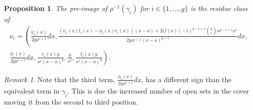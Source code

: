 \documentclass[11pt]{article} %
\theoremstyle{plain}
\newtheorem{prop}[defn]{Proposition}
\theoremstyle{remark}
\newtheorem*{rem}{Remark}
\begin{document}
\begin{prop}\label{basis22}
The pre-image of $\rho^{-1}(\gamma_i)$ for $i \in \{1, \ldots, g\}$ is the residue class of
\begin{multline*}
\nu_i = \left(\frac{\psi_i(x)}{2yx^{i+1}}dx, \frac{(\psi_i(x)t_i(x) - \phi_i(x)r_i(x))(x-a) + 2if(x)(-1)^{g-i+1}\binom{g}{i} a^{g-i+1}x^i}{2yx^{i+1}(x-a)^{g+1}}dx,\right. \\\left. \frac{\phi_i(x)}{2yx^{i+1}}dx,  \frac{r_i(x)y}{x^i(x-a)^g}, \frac{y}{x^i},  \frac{t_i(x)y}{x^i(x-a)^g} \right).
\end{multline*}
\end{prop}
\begin{rem}
Note that the third term, $\frac{\phi_i(x)}{2yx^{i+1}} dx$, has a different sign than the equivalent term in $\gamma_i$.
This is due the increased number of open sets in the cover moving it from the second to third position.
\end{rem}
\end{document}

